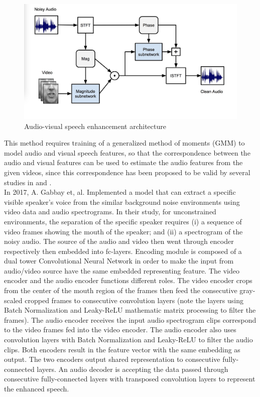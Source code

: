 \documentclass[runningheads,a4paper]{llncs}
\begin{document}
\begin{figure}[h!]
\includegraphics[scale=0.19]{fig3.png}
\caption{Audio-visual speech enhancement architecture}
\label{fig:framework}
\end{figure}

This method requires training of a generalized method of moments (GMM) to model audio and visual speech features, so that the correspondence between the audio and visual features can be used to estimate the audio features from the given videos, since this correspondence has been proposed to be valid by several studies in \cite{5} and \cite{6}.\\

In 2017, A. Gabbay et, al. \cite{8} Implemented a model that can extract a specific visible speaker’s voice from the similar background noise environments using video data and audio spectrograms. In their study, for unconstrained environments, the separation of the specific speaker requires (i) a sequence of video frames showing the mouth of the speaker; and (ii) a spectrogram of the noisy audio. The source of the audio and video then went through encoder respectively then embedded into fc-layers. Encoding module is composed of a dual tower Convolutional Neural Network in order to make the input from audio/video source have the same embedded representing feature. The video encoder and the audio encoder functions different roles. The video encoder crops from the center of the mouth region of the frames then feed the consecutive gray-scaled cropped frames to consecutive convolution layers (note the layers using Batch Normalization \cite{9} and Leaky-ReLU \cite{10} mathematic matrix processing to filter the frames). The audio encoder receives the input audio spectrogram clips correspond to the video frames fed into the video encoder. The audio encoder also uses convolution layers with Batch Normalization \cite{9} and Leaky-ReLU \cite{10} to filter the audio clips. Both encoders result in the feature vector with the same embedding as output. The two encoders output shared representation to consecutive fully-connected layers. An audio decoder is accepting the data passed through consecutive fully-connected layers with transposed convolution layers to represent the enhanced speech.\\
\end{document}
